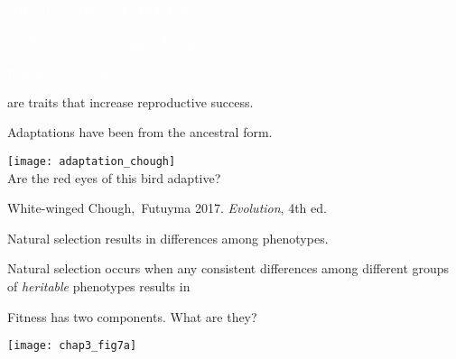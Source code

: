 \documentclass[t]{beamer}
\begin{document}

{
	\begin{frame}[t]{\textcolor{white}{Natural selection and adaptations}}
	
	\vfilll
	
	\tiny\hfill \textcolor{white}{\textcopyright\,sFutuyma 2017. \textit{Evolution}, 4th ed.}
\end{frame}
}


{
	\begin{frame}[b,plain]{\textcolor{white}{How would you define} }
	
	\vfilll
	
	\tiny \hfill {}
	
\end{frame}
}


\begin{frame}[t, plain]{ are traits that increase reproductive success.}

\vspace{-\baselineskip}

\hangpara Adaptations have been  from the ancestral form.\bigskip

\texttt{[image: adaptation\_chough]}\\
Are the red eyes of this bird adaptive?

\vfilll

\hfill \tiny White-winged Chough, \textcopyright\,Futuyma 2017. \textit{Evolution}, 4th ed.

\end{frame}


\begin{frame}[t,plain]{Natural selection results in  differences among phenotypes.}

\vspace{-\baselineskip}

\begin{multicols}{2}

\hangpara Natural selection occurs when any consistent differences among different groups of \emph{heritable} phenotypes results in 

\hangpara Fitness has two components. What are they?

\columnbreak

\texttt{[image: chap3\_fig7a]}

\end{multicols}
\end{frame}
\end{document}
